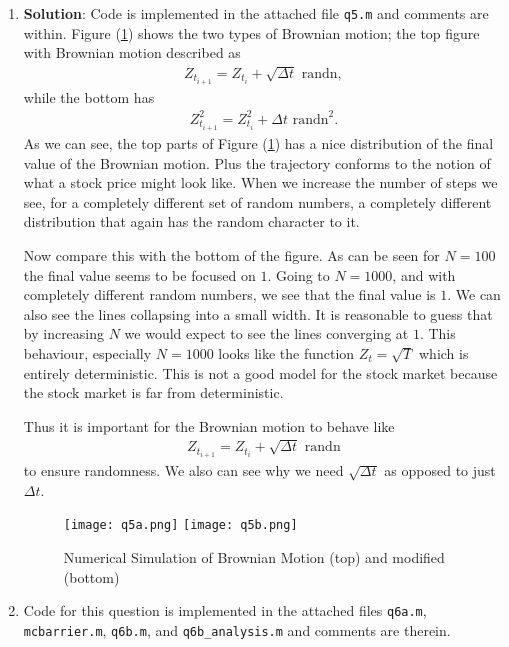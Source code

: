 \documentclass[10pt,english]{article}
\theoremstyle{plain}
\newcommand{\dt}{\Delta t}
\begin{document}
\begin{enumerate}
\item \textbf{Solution}: Code is implemented in the attached file \texttt{q5.m} and comments are within. Figure (\ref{bm1})  shows the two types of Brownian motion; the top figure with Brownian motion described as
\begin{align*}
Z_{t_{i+1}}= Z_{t_{i}} + \sqrt{\dt}\text{ randn},
\end{align*}
while the bottom has
\begin{align*}
Z_{t_{i+1}}^2= Z_{t_{i}}^2 +\dt\text{ randn}^2.
\end{align*}
As we can see, the top parts of Figure (\ref{bm1}) has a nice distribution of the final value of the Brownian motion. Plus the trajectory conforms to the notion of what a stock price might look like. When we increase the number of steps we see, for a completely different set of random numbers, a completely different distribution that again has the random character to it. 

Now compare this with the bottom of the figure. As can be seen for $N=100$ the final value seems to be focused on $1$. Going to $N=1000$, and with completely different random numbers, we see that the final value is $1$. We can also see the lines collapsing into a small width. It is reasonable to guess that by increasing $N$ we would expect to see the lines converging at $1$. This behaviour, especially $N=1000$ looks like the function $Z_{t}=\sqrt{T}$ which is entirely deterministic. This is not a good model for the stock market because the stock market is far from deterministic.

Thus it is important for the Brownian motion to behave like
\begin{align*}
Z_{t_{i+1}}= Z_{t_{i}} + \sqrt{\dt}\text{ randn}
\end{align*}
to ensure randomness. We also can see why we need $\sqrt{\dt}$ as opposed to just $\dt$.

\begin{figure}

\begin{center}
\texttt{[image: q5a.png]}
\texttt{[image: q5b.png]}
\end{center}
\caption{Numerical Simulation of Brownian Motion (top) and modified (bottom)}\label{bm1}
\end{figure}

\item Code for this question is implemented in the attached files \texttt{q6a.m}, \texttt{mcbarrier.m}, \texttt{q6b.m}, and \texttt{q6b\_analysis.m} and comments are therein.


\end{enumerate}
\end{document}
